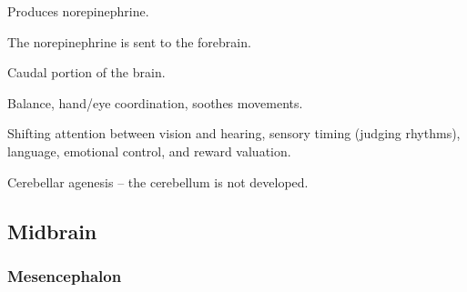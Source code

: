 \begin{coloredlist}
\begin{coloredlist}
\begin{coloredlist}
            \begin{coloredlist}
                \item Produces norepinephrine.
                \item The norepinephrine is sent to the forebrain.
            \end{coloredlist}
        \end{coloredlist}
        \item {}
        \begin{coloredlist}
            \item Caudal portion of the brain.
            \item Balance, hand/eye coordination, soothes movements.
            \item Shifting attention between vision and hearing, sensory timing (judging rhythms), language, emotional control, and reward valuation.
            \item Cerebellar agenesis -- the cerebellum is not developed.
        \end{coloredlist}
    \end{coloredlist}
\end{coloredlist}

\subsection{Midbrain}

\subsubsection{Mesencephalon}

